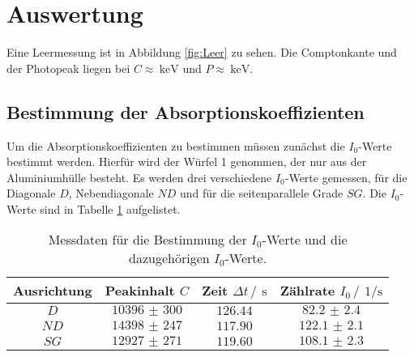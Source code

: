 \section{Auswertung}
\label{sec:Auswertung}
Eine Leermessung ist in Abbildung \ref{fig:Leer} zu sehen. Die Comptonkante und der Photopeak liegen bei $C\approx \SI{}{\kilo\eV}$ und 
$P\approx\SI{}{\kilo\eV}$.
\subsection{Bestimmung der Absorptionskoeffizienten}
Um die Absorptionskoeffizienten zu bestimmen müssen zunächst die $I_0$-Werte bestimmt werden. 
Hierfür wird der Würfel 1 genommen, der nur aus der Aluminiumhülle besteht. Es werden drei 
verschiedene $I_0$-Werte gemessen, für die Diagonale $D$, Nebendiagonale $ND$ und für die seitenparallele Grade $SG$.
Die $I_0$-Werte sind in Tabelle \ref{tab:I_0} aufgelistet.
\FloatBarrier
\begin{table}
    \centering
    \caption{Messdaten für die Bestimmung der $I_0$-Werte und die dazugehörigen $I_0$-Werte.}
    \label{tab:I_0}
    \begin{tabular}{c c c c}
        \toprule
        Ausrichtung&Peakinhalt $C$&Zeit $\Delta t \,/\,\SI{}{\second}$&Zählrate $I_0 \,/\,\SI{}{1\per\second}$\\
        \midrule
        $D$ &$\num{10396(300)}$&$\num{126.44}$&$\num{82.2(24)}$\\
        $ND$&$\num{14398(247)}$&$\num{117.90}$&$\num{122.1(21)}$\\
        $SG$&$\num{12927(271)}$&$\num{119.60}$&$\num{108.1(23)}$\\
        \bottomrule
    \end{tabular}
\end{table}
\FloatBarrier
